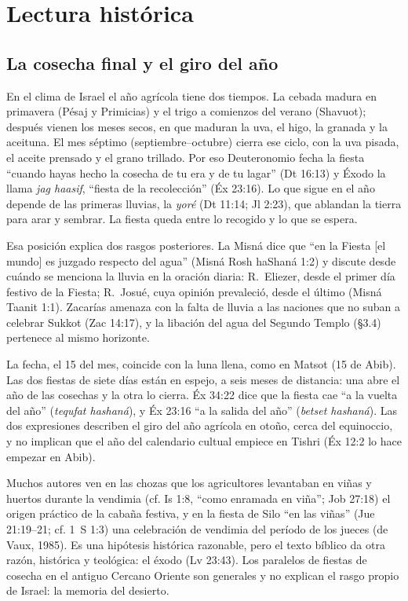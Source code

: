 \documentclass[11pt,letterpaper]{article}
\begin{document}
\section{Lectura histórica}

\subsection{La cosecha final y el giro del año}
En el clima de Israel el año agrícola tiene dos tiempos. La cebada madura en primavera (Pésaj y Primicias) y el trigo a comienzos del verano (Shavuot); después vienen los meses secos, en que maduran la uva, el higo, la granada y la aceituna. El mes séptimo (septiembre--octubre) cierra ese ciclo, con la uva pisada, el aceite prensado y el grano trillado. Por eso Deuteronomio fecha la fiesta ``cuando hayas hecho la cosecha de tu era y de tu lagar'' (Dt 16:13) y Éxodo la llama \emph{jag haasif}, ``fiesta de la recolección'' (Éx 23:16). Lo que sigue en el año depende de las primeras lluvias, la \emph{yoré} (Dt 11:14; Jl 2:23), que ablandan la tierra para arar y sembrar. La fiesta queda entre lo recogido y lo que se espera.

Esa posición explica dos rasgos posteriores. La Misná dice que ``en la Fiesta [el mundo] es juzgado respecto del agua'' (Misná Rosh haShaná 1:2) y discute desde cuándo se menciona la lluvia en la oración diaria: R.\ Eliezer, desde el primer día festivo de la Fiesta; R.\ Josué, cuya opinión prevaleció, desde el último (Misná Taanit 1:1). Zacarías amenaza con la falta de lluvia a las naciones que no suban a celebrar Sukkot (Zac 14:17), y la libación del agua del Segundo Templo (§3.4) pertenece al mismo horizonte.

La fecha, el 15 del mes, coincide con la luna llena, como en Matsot (15 de Abib). Las dos fiestas de siete días están en espejo, a seis meses de distancia: una abre el año de las cosechas y la otra lo cierra. Éx 34:22 dice que la fiesta cae ``a la vuelta del año'' (\emph{tequfat hashaná}), y Éx 23:16 ``a la salida del año'' (\emph{betset hashaná}). Las dos expresiones describen el giro del año agrícola en otoño, cerca del equinoccio, y no implican que el año del calendario cultual empiece en Tishri (Éx 12:2 lo hace empezar en Abib).

\begin{nota}[Precisión]
Muchos autores ven en las chozas que los agricultores levantaban en viñas y huertos durante la vendimia (cf. Is 1:8, ``como enramada en viña''; Job 27:18) el origen práctico de la cabaña festiva, y en la fiesta de Silo ``en las viñas'' (Jue 21:19--21; cf. 1~S 1:3) una celebración de vendimia del período de los jueces (de Vaux, 1985). Es una hipótesis histórica razonable, pero el texto bíblico da otra razón, histórica y teológica: el éxodo (Lv 23:43). Los paralelos de fiestas de cosecha en el antiguo Cercano Oriente son generales y no explican el rasgo propio de Israel: la memoria del desierto.
\end{nota}
\end{document}
